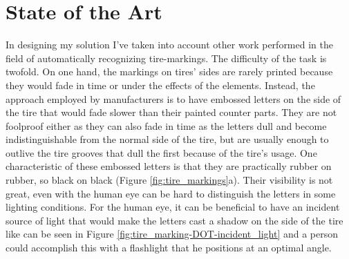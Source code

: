 \chapter{State of the Art}\pagestyle{fancy}\setlength{\parindent}{3em}
\label{chap:state-of-the-art}

In designing my solution I've taken into account other work performed in the field of automatically recognizing tire-markings. The difficulty of the task is twofold. On one hand, the markings on tires' sides are rarely printed because they would fade in time or under the effects of the elements. Instead, the approach employed by manufacturers is to have embossed letters on the side of the tire that would fade slower than their painted counter parts. They are not foolproof either as they can also fade in time as the letters dull and become indistinguishable from the normal side of the tire, but are usually enough to outlive the tire grooves that dull the first because of the tire's usage. One characteristic of these embossed letters is that they are practically rubber on rubber, so black on black (Figure \ref{fig:tire_markings}a). Their visibility is not great, even with the human eye can be hard to distinguish the letters in some lighting conditions. For the human eye, it can be beneficial to have an incident source of light that would make the letters cast a shadow on the side of the tire like can be seen in Figure \ref{fig:tire_marking-DOT-incident_light} and a person could accomplish this with a flashlight that he positions at an optimal angle.


